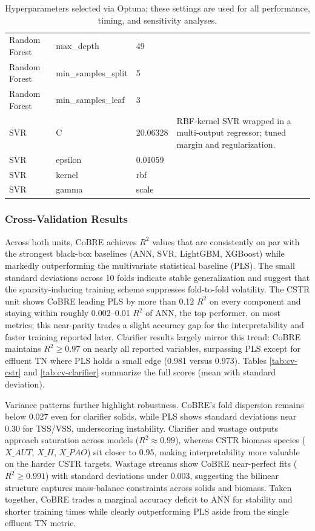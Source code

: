 \documentclass{article}
\begin{document}
\begin{table}[h]
\begin{tabular}{lll p{8cm}}
Random Forest & max\_depth & 49 & \\
Random Forest & min\_samples\_split & 5 & \\
Random Forest & min\_samples\_leaf & 3 & \\
SVR & C & 20.06328 & RBF-kernel SVR wrapped in a multi-output regressor; tuned margin and regularization. \\
SVR & epsilon & 0.01059 & \\
SVR & kernel & rbf & \\
SVR & gamma & scale & \\
\end{tabular}
\caption{Hyperparameters selected via Optuna; these settings are used for all performance, timing, and sensitivity analyses.}
\label{tab:optuna}
\end{table}

\subsubsection{Cross-Validation Results}

Across both units, CoBRE achieves $R^{2}$ values that are consistently on par with the strongest black-box baselines (ANN, SVR, LightGBM, XGBoost) while markedly outperforming the multivariate statistical baseline (PLS). The small standard deviations across 10 folds indicate stable generalization and suggest that the sparsity-inducing training scheme suppresses fold-to-fold volatility. The CSTR unit shows CoBRE leading PLS by more than 0.12 $R^{2}$ on every component and staying within roughly 0.002--0.01 $R^{2}$ of ANN, the top performer, on most metrics; this near-parity trades a slight accuracy gap for the interpretability and faster training reported later. Clarifier results largely mirror this trend: CoBRE maintains $R^{2} \geq 0.97$ on nearly all reported variables, surpassing PLS except for effluent TN where PLS holds a small edge (0.981 versus 0.973). Tables \ref{tab:cv-cstr} and \ref{tab:cv-clarifier} summarize the full scores (mean with standard deviation).

Variance patterns further highlight robustness. CoBRE's fold dispersion remains below 0.027 even for clarifier solids, while PLS shows standard deviations near 0.30 for TSS/VSS, underscoring instability. Clarifier and wastage outputs approach saturation across models ($R^{2} \approx 0.99$), whereas CSTR biomass species ($X\_AUT$, $X\_H$, $X\_PAO$) sit closer to 0.95, making interpretability more valuable on the harder CSTR targets. Wastage streams show CoBRE near-perfect fits ($R^{2} \geq 0.991$) with standard deviations under 0.003, suggesting the bilinear structure captures mass-balance constraints across solids and biomass. Taken together, CoBRE trades a marginal accuracy deficit to ANN for stability and shorter training times while clearly outperforming PLS aside from the single effluent TN metric.
\end{document}

